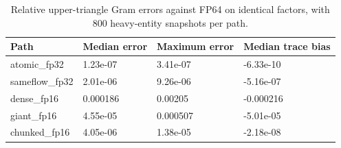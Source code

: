 \begin{table}
\centering
\caption{Relative upper-triangle Gram errors against FP64 on identical factors, with 800 heavy-entity snapshots per path.}
\begin{tabular}{llll}
\hline
Path & Median error & Maximum error & Median trace bias \\
\hline
atomic\_fp32 & 1.23e-07 & 3.41e-07 & -6.33e-10 \\
sameflow\_fp32 & 2.01e-06 & 9.26e-06 & -5.16e-07 \\
dense\_fp16 & 0.000186 & 0.00205 & -0.000216 \\
giant\_fp16 & 4.55e-05 & 0.000507 & -5.01e-05 \\
chunked\_fp16 & 4.05e-06 & 1.38e-05 & -2.18e-08 \\
\hline
\end{tabular}
\end{table}

